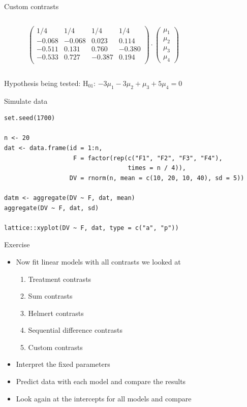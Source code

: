 \documentclass[aspectratio=169]{beamer}
\begin{document}
\begin{frame}{Custom contrasts}
\begin{columns}
\begin{column}[t]{.5\textwidth}
\[\begin{pmatrix}
    1/4 & 1/4 & 1/4 & 1/4 \\ 
  -0.068 & -0.068 & 0.023 & 0.114 \\ 
  -0.511 & 0.131 & 0.760 & -0.380 \\ 
  -0.533 & 0.727 & -0.387 & 0.194 \\ 
  \end{pmatrix} \cdot
  \begin{pmatrix}
    \mu_1 \\
    \mu_2 \\
    \mu_3 \\
    \mu_4
  \end{pmatrix}
\]
    \end{column}
    \begin{column}[t]{.5\textwidth}
    \end{column}
  \end{columns}
  \vspace{.1cm}
Hypothesis being tested:
H$_{01}$: $-3\mu_1 - 3\mu_2 + \mu_3 + 5\mu_4 = 0$
\end{frame}

\begin{frame}[fragile]{Simulate data}
\begin{lstlisting}
set.seed(1700)

n <- 20
dat <- data.frame(id = 1:n,
                   F = factor(rep(c("F1", "F2", "F3", "F4"),
                                  times = n / 4)),
                  DV = rnorm(n, mean = c(10, 20, 10, 40), sd = 5)) 

datm <- aggregate(DV ~ F, dat, mean)
aggregate(DV ~ F, dat, sd)

lattice::xyplot(DV ~ F, dat, type = c("a", "p"))
\end{lstlisting}
\end{frame}


\begin{frame}{}
  \begin{block}{Exercise}
    \begin{itemize}
      \item Now fit linear models with all contrasts we looked at
        \begin{enumerate}
          \item Treatment contrasts
          \item Sum contrasts
          \item Helmert contrasts
          \item Sequential difference contrasts
          \item Custom contrasts
        \end{enumerate}
      \item Interpret the fixed parameters
      \item Predict data with each model and compare the results
      \item Look again at the intercepts for all models and compare
    \end{itemize}
  \end{block}
\end{frame}
\end{document}
